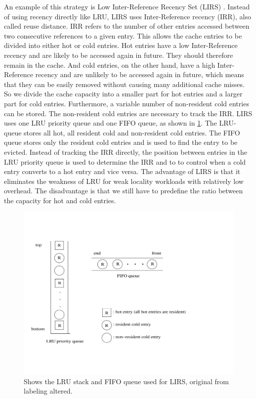 \documentclass[
	12pt,
	a4paper,
	abstract,
	bibliography=totoc,
	chapterprefix,
	headings=openright,
	numbers=endperiod,
	parskip=half,
	twoside,
]{scrreprt}
\begin{document}
An example of this strategy is Low Inter-Reference Recency Set (LIRS) \cite{10.1145/511399.511340}.
Instead of using recency directly like LRU, LIRS uses Inter-Reference recency (IRR), also called reuse distance.
IRR refers to the number of other entries accessed between two consecutive references to a given entry.
This allows the cache entries to be divided into either hot or cold entries.
Hot entries have a low Inter-Reference recency and are likely to be accessed again in future.
They should therefore remain in the cache.
And cold entries, on the other hand, have a high Inter-Reference recency and are unlikely to be accessed again in future, 
which means that they can be easily removed without causing many additional cache misses.
So we divide the cache capacity into a smaller part for hot entries and a larger part for cold entries.
Furthermore, a variable number of non-resident cold entries can be stored.
The non-resident cold entries are necessary to track the IRR.
LIRS uses one LRU priority queue and one FIFO queue, as shown in \cref{fig:lirs queues}.
The LRU-queue stores all hot, all resident cold and non-resident cold entries.
The FIFO queue stores only the resident cold entries and is used to find the entry to be evicted.
Instead of tracking the IRR directly, the position between entries in the LRU priority queue is used to determine the IRR and to 
to control when a cold entry converts to a hot entry and vice versa.
The advantage of LIRS is that it eliminates the weakness of LRU for weak locality workloads with relatively low overhead.
The disadvantage is that we still have to predefine the ratio between the capacity for hot and cold entries.

\begin{figure}[ht]
	\centering
	\includegraphics[scale=0.5]{lirs_queues.jpg}
	\caption{Shows the LRU stack and FIFO queue used for LIRS, original from \cite{10.1145/511399.511340} labeling  altered.}
		\label{fig:lirs queues}
\end{figure}
\end{document}
